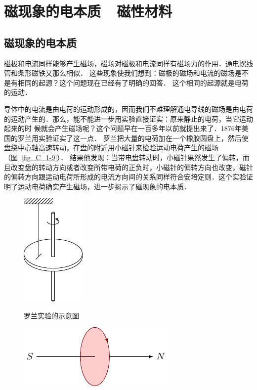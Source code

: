 \section{磁现象的电本质~~磁性材料}
\subsection{磁现象的电本质}


磁极和电流同样能够产生磁场，磁场对磁极和电流同样有磁场力的作用．通电螺线管和条形磁铁又那么相似．
这些现象使我们想到：磁极的磁场和电流的磁场是不是有相同的起源？这个问题现在已经有了明确的回答．
这个相同的起源就是电荷的运动．

导体中的电流是由电荷的运动形成的，因而我们不难理解通电导线的磁场是由电荷的运动产生的．那么，能不能进一步用实验直接证实：原来静止的电荷，当它运动起来的时
候就会产生磁场呢？这个问题早在一百多年以前就提出来了．1876年美国的罗兰用实验证实了这一点．
罗兰把大量的电荷加在一个橡胶圆盘上，然后使盘绕中心轴高速转动，在盘的附近用小磁针来检验运动电荷产生的磁场（图~\ref{fig_C_1-9}）．
结果他发现：当带电盘转动时，小磁针果然发生了偏转，而且改变盘的转动方向或者改变所带电荷的正负时，小磁针的偏转方向也改变，磁针的偏转方向跟运动电荷所形成的电流方向间的关系同样符合安培定则．这个实验证明了运动电荷确实产生磁场，进一步揭示了磁现象的电本质．

\begin{figure}[htbp]
    \centering
    \begin{minipage}[t]{0.48\textwidth}
    	\centering
        \includegraphics{fig/C/1-9.pdf}
        \caption{罗兰实验的示意图}\label{fig_C_1-9}
    \end{minipage}
    \begin{minipage}[t]{0.48\textwidth}
        \centering
        \includegraphics{fig/C/1-10.pdf}
        \caption{}\label{fig_C_1-10}
    \end{minipage}
\end{figure}


